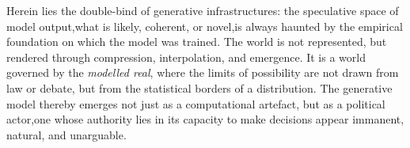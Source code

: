 \begin{orangebox}
	Herein lies the double-bind of generative infrastructures: the speculative space of model output,what is likely, coherent, or novel,is always haunted by the empirical foundation on which the model was trained. The world is not represented, but rendered through compression, interpolation, and emergence. It is a world governed by the \textit{modelled real}, where the limits of possibility are not drawn from law or debate, but from the statistical borders of a distribution. The generative model thereby emerges not just as a computational artefact, but as a political actor,one whose authority lies in its capacity to make decisions appear immanent, natural, and unarguable.
\end{orangebox}


%
%
%
%
%
%
%
